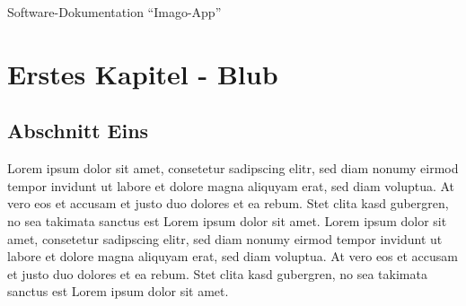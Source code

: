 \documentclass[10pt, a4paper]{scrreprt}
\begin{document}
 Software-Dokumentation "`Imago-App"'\\ 
\chapter{Erstes Kapitel - Blub}
\section{Abschnitt Eins}
Lorem ipsum dolor sit amet, consetetur sadipscing elitr, sed diam nonumy eirmod tempor invidunt ut labore et dolore magna aliquyam erat, sed diam voluptua. At vero eos et accusam et justo duo dolores et ea rebum. Stet clita kasd gubergren, no sea takimata sanctus est Lorem ipsum dolor sit amet. Lorem ipsum dolor sit amet, consetetur sadipscing elitr, sed diam nonumy eirmod tempor invidunt ut labore et dolore magna aliquyam erat, sed diam voluptua. At vero eos et accusam et justo duo dolores et ea rebum. Stet clita kasd gubergren, no sea takimata sanctus est Lorem ipsum dolor sit amet.
 
\end{document}
